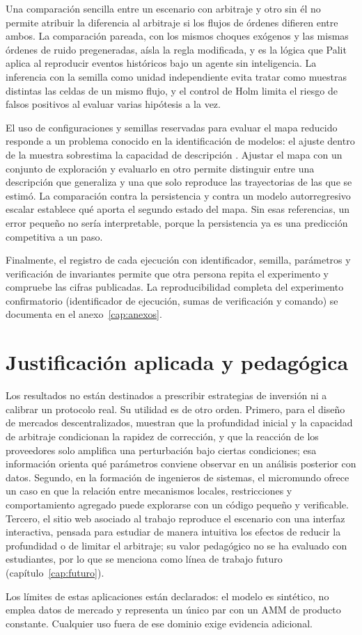 Una comparación sencilla entre un escenario con arbitraje y otro sin él no permite atribuir la diferencia al arbitraje si los flujos de órdenes difieren entre ambos. La comparación pareada, con los mismos choques exógenos y las mismas órdenes de ruido pregeneradas, aísla la regla modificada, y es la lógica que Palit \cite{palit2022shuffled} aplica al reproducir eventos históricos bajo un agente sin inteligencia. La inferencia con la semilla como unidad independiente evita tratar como muestras distintas las celdas de un mismo flujo, y el control de Holm limita el riesgo de falsos positivos al evaluar varias hipótesis a la vez.

El uso de configuraciones y semillas reservadas para evaluar el mapa reducido responde a un problema conocido en la identificación de modelos: el ajuste dentro de la muestra sobrestima la capacidad de descripción \cite{lamperti2018surrogates}. Ajustar el mapa con un conjunto de exploración y evaluarlo en otro permite distinguir entre una descripción que generaliza y una que solo reproduce las trayectorias de las que se estimó. La comparación contra la persistencia y contra un modelo autorregresivo escalar establece qué aporta el segundo estado del mapa. Sin esas referencias, un error pequeño no sería interpretable, porque la persistencia ya es una predicción competitiva a un paso.

Finalmente, el registro de cada ejecución con identificador, semilla, parámetros y verificación de invariantes \cite{grimm2020odd,railsback2019agent} permite que otra persona repita el experimento y compruebe las cifras publicadas. La reproducibilidad completa del experimento confirmatorio (identificador de ejecución, sumas de verificación y comando) se documenta en el anexo~\ref{cap:anexos}.

\section{Justificación aplicada y pedagógica}

Los resultados no están destinados a prescribir estrategias de inversión ni a calibrar un protocolo real. Su utilidad es de otro orden. Primero, para el diseño de mercados descentralizados, muestran que la profundidad inicial y la capacidad de arbitraje condicionan la rapidez de corrección, y que la reacción de los proveedores solo amplifica una perturbación bajo ciertas condiciones; esa información orienta qué parámetros conviene observar en un análisis posterior con datos. Segundo, en la formación de ingenieros de sistemas, el micromundo ofrece un caso en que la relación entre mecanismos locales, restricciones y comportamiento agregado puede explorarse con un código pequeño y verificable. Tercero, el sitio web asociado al trabajo reproduce el escenario con una interfaz interactiva, pensada para estudiar de manera intuitiva los efectos de reducir la profundidad o de limitar el arbitraje; su valor pedagógico no se ha evaluado con estudiantes, por lo que se menciona como línea de trabajo futuro (capítulo~\ref{cap:futuro}).

Los límites de estas aplicaciones están declarados: el modelo es sintético, no emplea datos de mercado y representa un único par con un AMM de producto constante. Cualquier uso fuera de ese dominio exige evidencia adicional.
